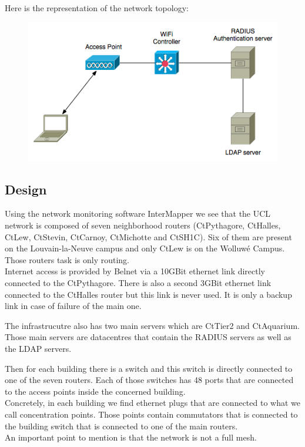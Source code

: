 Here is the representation of the network topology:
\begin{figure}[H]
	\includegraphics[width=.9\linewidth]{Pictures/Chapter2/topology.png}
\end{figure}






\subsection{Design}
Using the network monitoring software InterMapper\cite{intermapper} we see that the UCL network is composed of seven neighborhood routers (CtPythagore, CtHalles, CtLew, CtStevin, CtCarnoy, CtMichotte and CtSH1C). Six of them are present on the Louvain-la-Neuve campus and only CtLew is on the Wolluwé Campus. Those routers task is only routing.\\

Internet access is provided by Belnet via a 10GBit ethernet link directly connected to the CtPythagore. There is also a second 3GBit ethernet link connected to the CtHalles router but this link is never used. It is only a backup link in case of failure of the main one.

The infrastrucutre also has two main servers which are CtTier2 and CtAquarium. Those main servers are datacentres that contain the RADIUS servers as well as the LDAP servers.

Then for each building there is a switch and this switch is directly connected to one of the seven routers. Each of those switches has 48 ports that are connected to the access points inside the concerned building.\\
Concretely, in each building we find ethernet plugs that are connected to what we call concentration points. Those points contain commutators that is connected to the building switch that is connected to one of the main routers.\\
An important point to mention is that the network is not a full mesh.

